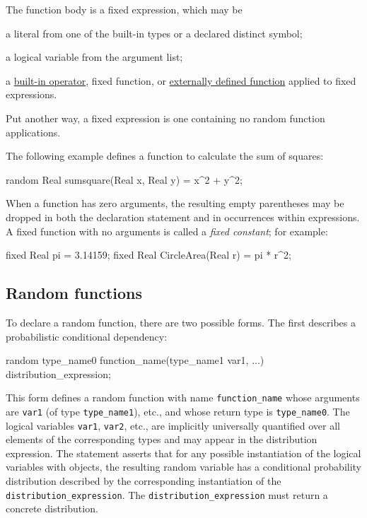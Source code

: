 \documentclass[12pt]{article}
\begin{document}
The function body is a fixed expression, which may be
\begin{itemize*}
\item a literal from one of the built-in types or a declared distinct symbol;
\item a logical variable from the argument list;
\item a \hyperref[builtin-operator-appendix]{built-in operator}, fixed function, or \hyperref[external-function-appendix]{externally defined function} applied to fixed expressions.
\end{itemize*}
Put another way, a fixed expression is one containing no random function applications.

The following example defines a function to calculate the sum of squares:
\begin{blogcode}
random Real sumsquare(Real x, Real y) = x^2 + y^2;
\end{blogcode}

When a function has zero arguments, the resulting empty parentheses may be dropped
in both the declaration statement and in occurrences within expressions.
A fixed function with no arguments is called a \emph{fixed constant}; for
example:
\begin{blogcode}
fixed Real pi = 3.14159;
fixed Real CircleArea(Real r) = pi * r^2;
\end{blogcode}



\subsection{Random functions}\label{random-function-section}

To declare a random function, there are two possible forms. The first describes a probabilistic
conditional dependency:
\begin{blogcode}
random type_name0 function_name(type_name1 var1, ...) ~ 
  distribution_expression;
\end{blogcode}
This form defines a random function with name \texttt{function\_name} whose arguments are {\tt var1} (of type \verb|type_name1|), etc.,
and whose return type is \verb|type_name0|. The logical variables {\tt var1}, {\tt var2}, etc., are implicitly universally quantified over
all elements of the corresponding types and may appear in the distribution expression. The statement asserts that for any possible instantiation of the
logical variables with objects, the resulting random variable has a conditional probability distribution
described by the corresponding instantiation of the {\tt distribution\_expression}. The {\tt distribution\_expression} must return a concrete distribution. 
\end{document}
